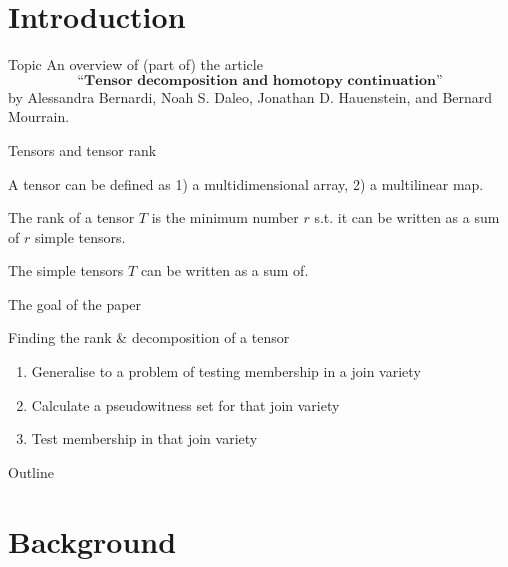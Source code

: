 
\section{Introduction}

\begin{frame}{Topic}
An overview of (part of) the article 
\[ \textbf{``Tensor decomposition and homotopy continuation''} \]
by Alessandra Bernardi, Noah S. Daleo, Jonathan D. Hauenstein, and Bernard Mourrain.
\end{frame}

\begin{frame}{Tensors and tensor rank}
  \begin{bee}[Tensor]
    A tensor can be defined as 1) a multidimensional array, 2) a multilinear map.
  \end{bee}

  \begin{bee}
    The rank of a tensor $T$ is the minimum number $r$ s.t. it can be written as a sum of $r$ simple tensors.
  \end{bee}

  \begin{bee}
     The simple tensors $T$ can be written as a sum of.
  \end{bee}
\end{frame}

\begin{frame}{The goal of the paper}
  \begin{bee}[Problem]
    Finding the rank \& decomposition of a tensor
  \end{bee}  
  \begin{bee}
    \begin{enumerate}
      \item Generalise to a problem of testing membership in a join variety
      \item Calculate a pseudowitness set for that join variety
      \item Test membership in that join variety
    \end{enumerate}
  \end{bee}
\end{frame}


\begin{frame}{Outline}
  \tableofcontents
\end{frame}

\section{Background}
